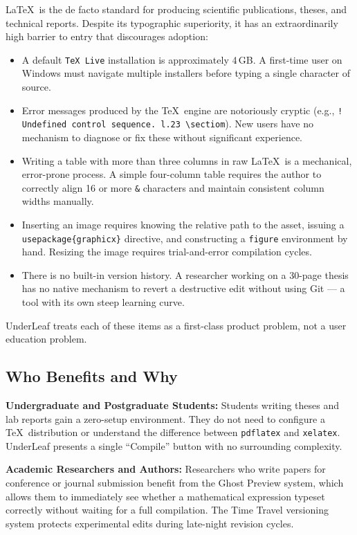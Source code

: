 \documentclass[11pt, a4paper]{article}
\begin{document}
\LaTeX\ is the de facto standard for producing scientific publications, theses, and technical reports. Despite its typographic superiority, it has an extraordinarily high barrier to entry that discourages adoption:

\begin{itemize}
    \item A default \texttt{TeX Live} installation is approximately 4\,GB. A first-time user on Windows must navigate multiple installers before typing a single character of source.
    \item Error messages produced by the \TeX\ engine are notoriously cryptic (e.g., \texttt{! Undefined control sequence. l.23 \textbackslash sectiom}). New users have no mechanism to diagnose or fix these without significant experience.
    \item Writing a table with more than three columns in raw \LaTeX\ is a mechanical, error-prone process. A simple four-column table requires the author to correctly align 16 or more \texttt{\&} characters and maintain consistent column widths manually.
    \item Inserting an image requires knowing the relative path to the asset, issuing a \texttt{\\usepackage\{graphicx\}} directive, and constructing a \texttt{figure} environment by hand. Resizing the image requires trial-and-error compilation cycles.
    \item There is no built-in version history. A researcher working on a 30-page thesis has no native mechanism to revert a destructive edit without using Git — a tool with its own steep learning curve.
\end{itemize}

UnderLeaf treats each of these items as a first-class product problem, not a user education problem.

\subsection{Who Benefits and Why}

\textbf{Undergraduate and Postgraduate Students:} Students writing theses and lab reports gain a zero-setup environment. They do not need to configure a \TeX\ distribution or understand the difference between \texttt{pdflatex} and \texttt{xelatex}. UnderLeaf presents a single ``Compile'' button with no surrounding complexity.

\textbf{Academic Researchers and Authors:} Researchers who write papers for conference or journal submission benefit from the Ghost Preview system, which allows them to immediately see whether a mathematical expression typeset correctly without waiting for a full compilation. The Time Travel versioning system protects experimental edits during late-night revision cycles.
\end{document}

